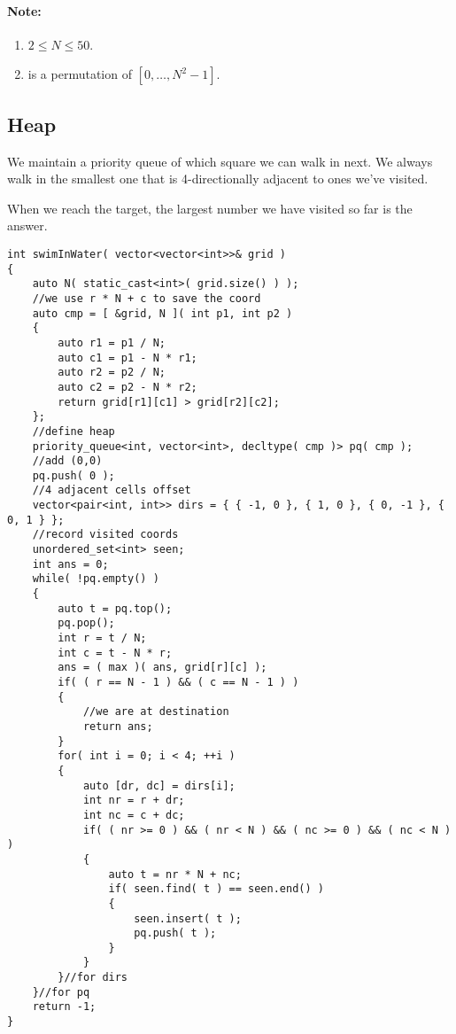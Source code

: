 \paragraph{Note:}

\begin{enumerate}
\item $2 \leq N \leq 50$.
\item {} is a permutation of $[0, \ldots, N^2 - 1]$.
\end{enumerate}

\subsection{Heap}
We maintain a priority queue of which square we can walk in next. We always walk in the smallest one that is 4-directionally adjacent to ones we've visited.

When we reach the target, the largest number we have visited so far is the answer.

\setcounter{lstlisting}{0}
\begin{lstlisting}[style=customc, caption={Heap}]
int swimInWater( vector<vector<int>>& grid )
{
    auto N( static_cast<int>( grid.size() ) );
    //we use r * N + c to save the coord
    auto cmp = [ &grid, N ]( int p1, int p2 )
    {
        auto r1 = p1 / N;
        auto c1 = p1 - N * r1;
        auto r2 = p2 / N;
        auto c2 = p2 - N * r2;
        return grid[r1][c1] > grid[r2][c2];
    };
    //define heap
    priority_queue<int, vector<int>, decltype( cmp )> pq( cmp );
    //add (0,0)
    pq.push( 0 );
    //4 adjacent cells offset
    vector<pair<int, int>> dirs = { { -1, 0 }, { 1, 0 }, { 0, -1 }, { 0, 1 } };
    //record visited coords
    unordered_set<int> seen;
    int ans = 0;
    while( !pq.empty() )
    {
        auto t = pq.top();
        pq.pop();
        int r = t / N;
        int c = t - N * r;
        ans = ( max )( ans, grid[r][c] );
        if( ( r == N - 1 ) && ( c == N - 1 ) )
        {
            //we are at destination
            return ans;
        }
        for( int i = 0; i < 4; ++i )
        {
            auto [dr, dc] = dirs[i];
            int nr = r + dr;
            int nc = c + dc;
            if( ( nr >= 0 ) && ( nr < N ) && ( nc >= 0 ) && ( nc < N ) )
            {
                auto t = nr * N + nc;
                if( seen.find( t ) == seen.end() )
                {
                    seen.insert( t );
                    pq.push( t );
                }
            }
        }//for dirs
    }//for pq
    return -1;
}
\end{lstlisting}